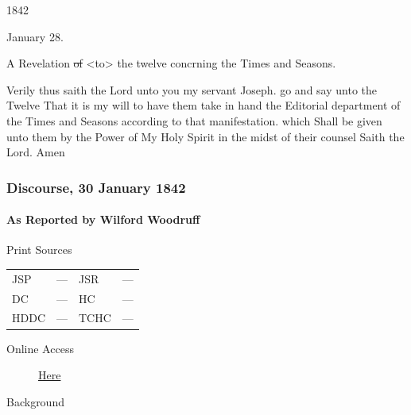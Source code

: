 				1842
				
				January 28.
				
				\begin{tightcenter}
					A Revelation \sout{of} <to> the twelve concrning the Times and Seasons.
				\end{tightcenter}
				
				Verily thus saith the Lord unto you my servant Joseph. go and say unto the Twelve That it is my will to have them take in hand the Editorial department of the Times and Seasons according to that manifestation. which Shall be given unto them by the Power of My Holy Spirit in the midst of their counsel Saith the Lord. Amen
				
		\subsubsection{Discourse, 30 January 1842}
			\label{EMS-1842-JS-30-JAN-1842}
			
			\paragraph{As Reported by Wilford Woodruff}
				\label{EMS-1842-JS-30-JAN-1842-WW}
			
				\begin{description}
					\item[Print Sources]
				\end{description}

				\begin{tabular}{p{0.5in}p{1in}p{0.5in}p{1in}}
					JSP	 	& ---		& JSR 		& --- \\
					DC	 	& ---		& HC 		& --- \\
					HDDC 	& ---		& TCHC 		& --- \\
				\end{tabular}
				
				\begin{description}
					\item[Online Access] \href{https://www.josephsmithpapers.org/paper-summary/discourse-30-january-1842/1}{Here}
				\end{description}
				
				\begin{description}
					\item[Background]
				\end{description}
				
